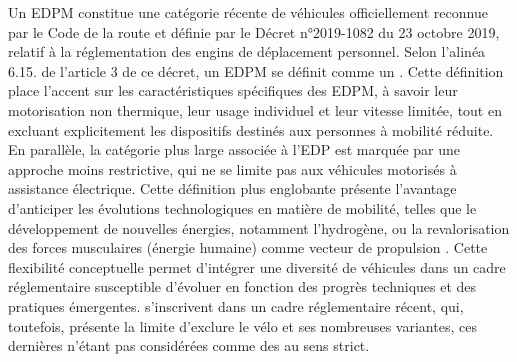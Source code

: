 \begin{refsegment}
{    Un \acrfull{EDPM} constitue une catégorie récente de véhicules officiellement reconnue par le Code de la route et définie par le Décret n°2019-1082 du 23 octobre 2019, relatif à la réglementation des engins de déplacement personnel. Selon l'alinéa 6.15. de l'article 3 de ce décret, un \acrshort{EDPM} se définit comme un  \textcolor{blue}{\autocite{legifrance_decret_2019}}. Cette définition place l'accent sur les caractéristiques spécifiques des \acrshort{EDPM}, à savoir leur motorisation non thermique, leur usage individuel et leur vitesse limitée, tout en excluant explicitement les dispositifs destinés aux personnes à mobilité réduite. En parallèle, la catégorie plus large associée à l'\acrfull{EDP} est marquée par une approche moins restrictive, qui ne se limite pas aux véhicules motorisés à assistance électrique. Cette définition plus englobante présente l’avantage d’anticiper les évolutions technologiques en matière de mobilité, telles que le développement de nouvelles énergies, notamment l’hydrogène, ou la revalorisation des forces musculaires (énergie humaine) comme vecteur de propulsion \textcolor{blue}{\autocite{mobilityurban_quest-ce_2019}}. Cette flexibilité conceptuelle permet d’intégrer une diversité de véhicules dans un cadre réglementaire susceptible d’évoluer en fonction des progrès techniques et des pratiques émergentes.
} s’inscrivent dans un cadre réglementaire récent, qui, toutefois, présente la limite d’exclure le vélo et ses nombreuses variantes, ces dernières n’étant pas considérées comme des  au sens strict.%


\end{refsegment}
